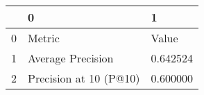 \begin{tabular}{lll}
\toprule
 & 0 & 1 \\
\midrule
0 & Metric & Value \\
1 & Average Precision & 0.642524 \\
2 & Precision at 10 (P@10) & 0.600000 \\
\bottomrule
\end{tabular}
